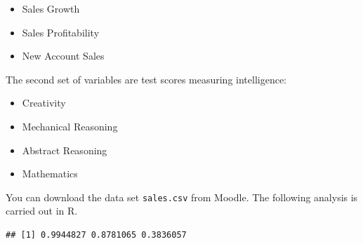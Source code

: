 \documentclass[
]{book}
\newenvironment{Shaded}{\begin{snugshade}}{\end{snugshade}}
\newcommand{\AttributeTok}[1]{\textcolor[rgb]{0.13,0.29,0.53}{#1}}
\newcommand{\ConstantTok}[1]{\textcolor[rgb]{0.56,0.35,0.01}{#1}}
\newcommand{\FunctionTok}[1]{\textcolor[rgb]{0.13,0.29,0.53}{\textbf{#1}}}
\newcommand{\NormalTok}[1]{#1}
\newcommand{\OtherTok}[1]{\textcolor[rgb]{0.56,0.35,0.01}{#1}}
\newcommand{\SpecialCharTok}[1]{\textcolor[rgb]{0.81,0.36,0.00}{\textbf{#1}}}
\newcommand{\StringTok}[1]{\textcolor[rgb]{0.31,0.60,0.02}{#1}}
\providecommand{\tightlist}{%
  \setlength{\itemsep}{0pt}\setlength{\parskip}{0pt}}
\theoremstyle{definition}
\theoremstyle{definition}
\theoremstyle{definition}
\theoremstyle{definition}
\theoremstyle{remark}
\begin{document}
\begin{itemize}
\tightlist
\item
  Sales Growth
\item
  Sales Profitability
\item
  New Account Sales
\end{itemize}

The second set of variables are test scores measuring intelligence:

\begin{itemize}
\tightlist
\item
  Creativity
\item
  Mechanical Reasoning
\item
  Abstract Reasoning
\item
  Mathematics
\end{itemize}

You can download the data set \texttt{sales.csv} from Moodle. The following analysis is carried out in R.

\begin{Shaded}
\end{Shaded}

\begin{verbatim}
## [1] 0.9944827 0.8781065 0.3836057
\end{verbatim}
\end{document}

